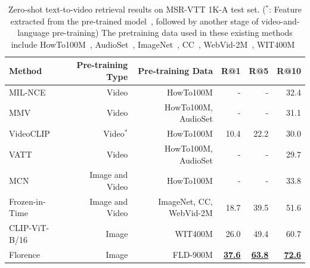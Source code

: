 \documentclass{article}
\begin{document}
\begin{table}[ht]
\centering
\setlength{\tabcolsep}{10.5pt}
\small
\renewcommand{\arraystretch}{1.35}
\begin{tabular}{l|r|r|rrr}
\toprule
Method & Pre-training Type & Pre-training Data & R@1 & R@5 & R@10 \\
\midrule
MIL-NCE~\cite{miech2020end} & Video & HowTo100M & - & - & 32.4 \\
MMV~\cite{alayrac2020self} & Video & HowTo100M, AudioSet & - & - & 31.1 \\
VideoCLIP~\cite{xu2021videoclip} & Video$^*$ & HowTo100M & 10.4 & 22.2 & 30.0 \\
VATT~\cite{akbari2021vatt} & Video & HowTo100M, AudioSet & - & - & 29.7 \\
MCN~\cite{chen2021multimodal} & Image and Video & HowTo100M & - & - & 33.8 \\
Frozen-in-Time~\cite{bain2021frozen} & Image and Video & ImageNet,
CC, WebVid-2M & 18.7 & 39.5 & 51.6 \\
\midrule
CLIP-ViT-B/16~\cite{radford2021learning} & Image & WIT400M & 26.0 & 49.4
& 60.7 \\
Florence & Image & FLD-900M & \underline{\bf{37.6}} & \underline{\bf{63.8}} & \underline{\bf{72.6}}
\\
\bottomrule
\end{tabular}
\caption{Zero-shot text-to-video retrieval results on MSR-VTT 1K-A test set. ($^*$: Feature extracted from the pre-trained model~\cite{miech2020end}, followed by another stage of video-and-language pre-training) The pretraining data used in these existing methods include HowTo100M~\cite{miech2019howto100m}, AudioSet~\cite{gemmeke2017audio},  ImageNet~\cite{deng2009imagenet}, CC~\cite{sharma2018conceptual},  WebVid-2M~\cite{bain2021frozen}, WIT400M~\cite{radford2021learning}}
\label{tab:t2v_retrieval_results}
\end{table}
\end{document}
